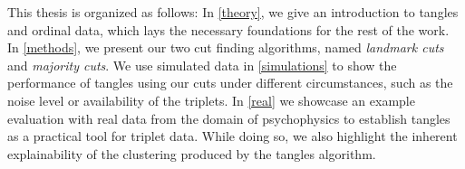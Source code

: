 This thesis is organized as follows: In \autoref{theory}, we give an introduction to tangles and ordinal data, which lays the necessary foundations for the rest of the work. 
In \autoref{methods}, we present our two cut finding algorithms, named \textit{landmark cuts} and \textit{majority cuts}.
We use simulated data in \autoref{simulations} to show the performance of tangles using our cuts under different circumstances, such as the noise level or availability of the triplets. 
In \autoref{real} we showcase an example evaluation with real data from the domain of psychophysics to establish tangles as a practical tool for triplet data.
While doing so, we also highlight the inherent explainability of the clustering produced by the tangles algorithm. 
